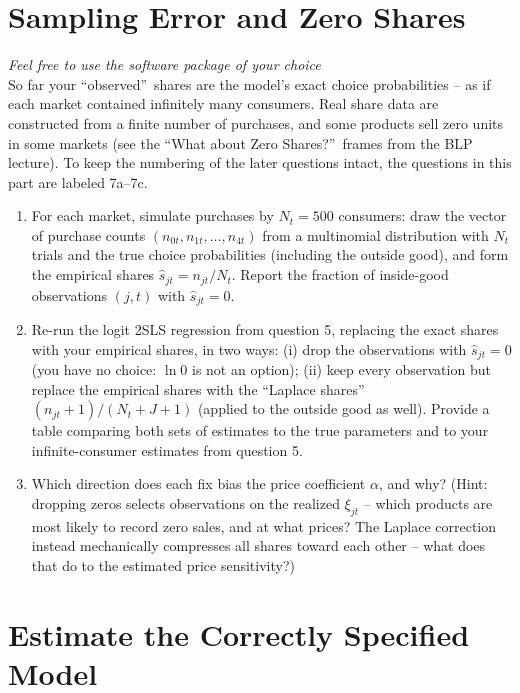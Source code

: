 \documentclass[english,11pt]{article}
\begin{document}
\section{Sampling Error and Zero Shares}
\textit{Feel free to use the software package of your choice}\\

So far your \textquotedblleft observed\textquotedblright\ shares are the
model's exact choice probabilities -- as if each market contained infinitely
many consumers. Real share data are constructed from a finite number of
purchases, and some products sell zero units in some markets (see the
\textquotedblleft What about Zero Shares?\textquotedblright\ frames from the
BLP lecture). To keep the numbering of the later questions intact, the
questions in this part are labeled 7a--7c.

\begin{enumerate}
\item[7a.] For each market, simulate purchases by $N_{t}=500$ consumers:
draw the vector of purchase counts $(n_{0t},n_{1t},\ldots ,n_{4t})$ from a
multinomial distribution with $N_{t}$ trials and the true choice
probabilities (including the outside good), and form the empirical shares $%
\hat{s}_{jt}=n_{jt}/N_{t}$. Report the fraction of inside-good observations $%
(j,t)$ with $\hat{s}_{jt}=0$.

\item[7b.] Re-run the logit 2SLS regression from question 5, replacing the
exact shares with your empirical shares, in two ways: (i) drop the
observations with $\hat{s}_{jt}=0$ (you have no choice: $\ln 0$ is not an
option); (ii) keep every observation but replace the empirical shares with
the \textquotedblleft Laplace shares\textquotedblright\ $%
(n_{jt}+1)/(N_{t}+J+1)$ (applied to the outside good as well). Provide a
table comparing both sets of estimates to the true parameters and to your
infinite-consumer estimates from question 5.

\item[7c.] Which direction does each fix bias the price coefficient $\alpha
$, and why? (Hint: dropping zeros selects observations on the realized $\xi
_{jt}$ -- which products are most likely to record zero sales, and at what
prices? The Laplace correction instead mechanically compresses all shares
toward each other -- what does that do to the estimated price sensitivity?)
\end{enumerate}

\section{Estimate the Correctly Specified Model}
\end{document}
